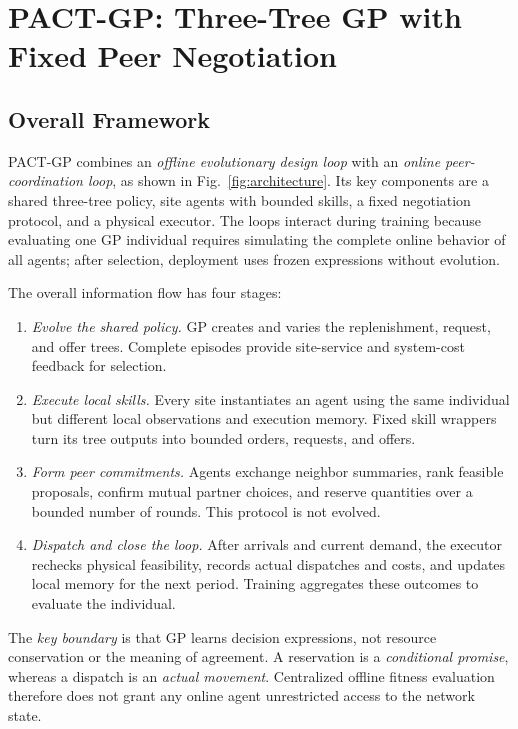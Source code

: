 \section{PACT-GP: Three-Tree GP with Fixed Peer Negotiation}
\label{sec:method}

\subsection{Overall Framework}
\label{subsec:overview}
PACT-GP combines an \emph{offline evolutionary design loop} with an
\emph{online peer-coordination loop}, as shown in
Fig.~\ref{fig:architecture}. Its key components are a shared three-tree
policy, site agents with bounded skills, a fixed negotiation protocol, and
a physical executor. The loops interact during training because evaluating
one GP individual requires simulating the complete online behavior of all
agents; after selection, deployment uses frozen expressions without evolution.

The overall information flow has four stages:
\begin{enumerate}
    \item \emph{Evolve the shared policy.} GP creates and varies the
    replenishment, request, and offer trees. Complete episodes provide
    site-service and system-cost feedback for selection.
    \item \emph{Execute local skills.} Every site instantiates an agent using
    the same individual but different local observations and execution
    memory. Fixed skill wrappers turn its tree outputs into bounded orders,
    requests, and offers.
    \item \emph{Form peer commitments.} Agents exchange neighbor summaries,
    rank feasible proposals, confirm mutual partner choices, and reserve
    quantities over a bounded number of rounds. This protocol is not evolved.
    \item \emph{Dispatch and close the loop.} After arrivals and current
    demand, the executor rechecks physical feasibility, records actual
    dispatches and costs, and updates local memory for the next period.
    Training aggregates these outcomes to evaluate the individual.
\end{enumerate}
The \emph{key boundary} is that GP learns decision expressions, not resource
conservation or the meaning of agreement. A reservation is a
\emph{conditional promise}, whereas a dispatch is an \emph{actual movement}.
Centralized offline fitness evaluation therefore does not grant any online
agent unrestricted access to the network state.

